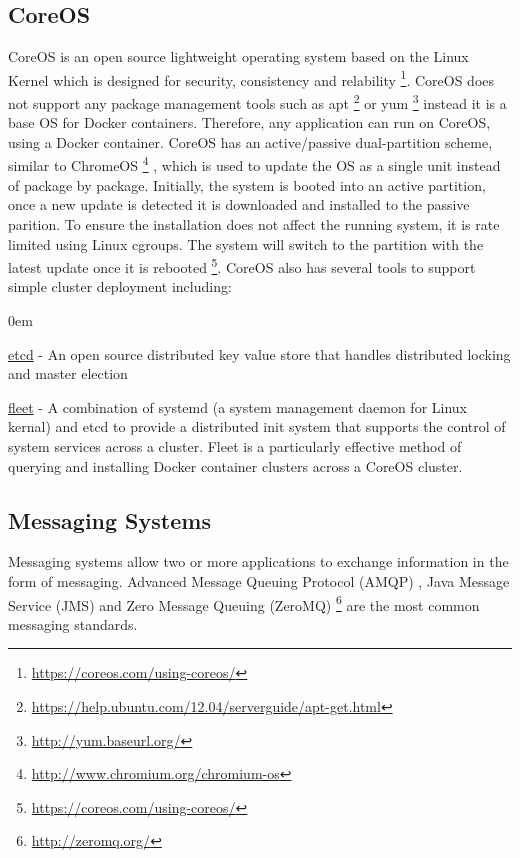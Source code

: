 \documentclass[a4paper,11pt,twoside]{article}
\begin{document}
\subsection{CoreOS} \label{CoreOS}
CoreOS is an open source lightweight operating system based on the Linux Kernel which is designed for security, consistency and relability \footnote {\label{coreos} \url {https://coreos.com/using-coreos/}}. CoreOS does not support any package management tools such as apt \footnote{\url{https://help.ubuntu.com/12.04/serverguide/apt-get.html}} or yum \footnote {\url{http://yum.baseurl.org/}} instead it is a base OS for Docker containers. Therefore, any application can run on CoreOS, using a Docker container. CoreOS has an active/passive dual-partition scheme, similar to ChromeOS \footnote{\url{http://www.chromium.org/chromium-os}} , which is used to update the OS as a single unit instead of package by package. Initially, the system is booted into an active partition, once a new update is detected it is downloaded and installed to the passive parition. To ensure the installation does not affect the running system, it is rate limited using Linux cgroups. The system will switch to the partition with the latest update once it is rebooted \footnote {\label{coreos} \url {https://coreos.com/using-coreos/}}. CoreOS also has several tools to support simple cluster deployment including:
  \begin{list}{-}{}
  \itemsep0em
  \item \underline{etcd} - An open source distributed key value store that handles distributed locking and master election
  
  \item \underline{fleet} - A combination of systemd (a system management daemon for Linux kernal) and etcd to provide a distributed init system that supports the control of system services across a cluster. Fleet is a particularly effective method of querying and installing Docker container clusters across a CoreOS cluster.
  \end{list}

\noindent
\subsection{Messaging Systems} \label{MOM}
Messaging systems allow two or more applications to exchange information in the form of messaging. Advanced Message Queuing Protocol (AMQP) \cite{AMPQ}, Java Message Service (JMS) \cite{JMS} and Zero Message Queuing (ZeroMQ) \footnote{\label{ZeroMQ} \url{http://zeromq.org/}} are the most common messaging standards. 
\end{document}
